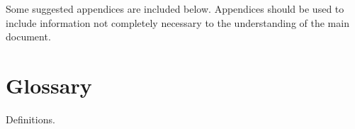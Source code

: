 \documentclass{l3deliverable}
\begin{document}
\appendix

Some suggested appendices are included below. Appendices should be
used to include information not completely necessary to the
understanding of the main document.


\section{Glossary}

Definitions.

\end{document}
